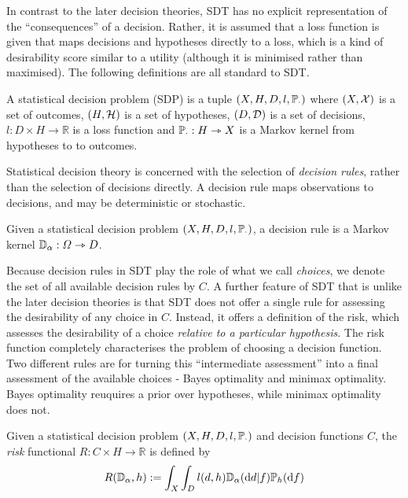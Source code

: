 In contrast to the later decision theories, SDT has no explicit representation of the ``consequences'' of a decision. Rather, it is assumed that a loss function is given that maps decisions and hypotheses directly to a loss, which is a kind of desirability score similar to a utility (although it is minimised rather than maximised). The following definitions are all standard to SDT.

\begin{definition}
A statistical decision problem (SDP) is a tuple $(X, H, D, l, \mathbb{P}_\cdot)$ where $(X,\mathcal{X})$ is a set of outcomes, $(H,\mathcal{H})$ is a set of hypotheses, $(D,\mathcal{D})$ is a set of decisions, $l:D\times H\to \mathbb{R}$ is a loss function and $\mathbb{P}_\cdot:H\rightarrowtriangle X$ is a Markov kernel from hypotheses to to outcomes.
\end{definition}

Statistical decision theory is concerned with the selection of \emph{decision rules}, rather than the selection of decisions directly. A decision rule maps observations to decisions, and may be deterministic or stochastic.

\begin{definition}
Given a statistical decision problem $(X, H, D, l, \mathbb{P}_\cdot)$, a decision rule is a Markov kernel $\mathbb{D}_\alpha:\Omega\rightarrowtriangle D$.
\end{definition}

Because decision rules in SDT play the role of what we call \emph{choices}, we denote the set of all available decision rules by $C$. A further feature of SDT that is unlike the later decision theories is that SDT does not offer a single rule for assessing the desirability of any choice in $C$. Instead, it offers a definition of the risk, which assesses the desirability of a choice \emph{relative to a particular hypothesis}. The risk function completely characterises the problem of choosing a decision function. Two different rules are for turning this ``intermediate assessment'' into a final assessment of the available choices - Bayes optimality and minimax optimality. Bayes optimality reuquires a prior over hypotheses, while minimax optimality does not.

\begin{definition}\label{def:risk}
Given a statistical decision problem $(X, H, D, l, \mathbb{P}_\cdot)$ and decision functions $C$, the \emph{risk} functional $R:C\times H\to \mathbb{R}$ is defined by
\begin{align}
    R(\mathbb{D}_\alpha,h):= \int_X \int_D l(d,h) \mathbb{D}_\alpha(\mathrm{d}d|f)\mathbb{P}_h(\mathrm{d}f)
\end{align}
\end{definition}

